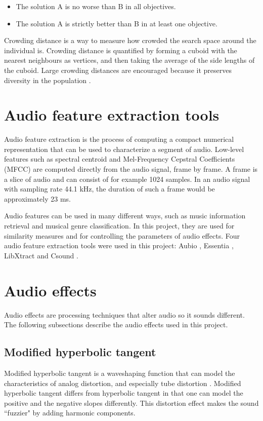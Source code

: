 \begin{itemize}  
\item The solution A is no worse than B in all objectives.
\item The solution A is strictly better than B in at least one objective.
\end{itemize}

Crowding distance is a way to measure how crowded the search space around the individual is. Crowding distance is quantified by forming a cuboid with the nearest neighbours as vertices, and then taking the average of the side lengths of the cuboid. Large crowding distances are encouraged because it preserves diversity in the population \citep{nsga2}.

\section{Audio feature extraction tools}
Audio feature extraction is the process of computing a compact numerical representation that can be used to characterize a segment of audio. Low-level features such as spectral centroid and Mel-Frequency Cepstral Coefficients (MFCC) \citep{mermelstein1976, logan2000} are computed directly from the audio signal, frame by frame. A frame is a slice of audio and can consist of for example 1024 samples. In an audio signal with sampling rate 44.1 kHz, the duration of such a frame would be approximately 23 ms.

Audio features can be used in many different ways, such as music information retrieval and musical genre classification. In this project, they are used for similarity measures and for controlling the parameters of audio effects. Four audio feature extraction tools were used in this project: Aubio \citep{brossier2003aubio}, Essentia \citep{bogdanov2013essentia}, LibXtract \citep{bullock2007libxtract} and Csound \citep{csound}.

\section{Audio effects}
Audio effects are processing techniques that alter audio so it sounds different. The following subsections describe the audio effects used in this project.

\subsection{Modified hyperbolic tangent}
Modified hyperbolic tangent is a waveshaping function that can model the characteristics of analog distortion, and especially tube distortion \citep{mtanh}. Modified hyperbolic tangent differs from hyperbolic tangent in that one can model the positive and the negative slopes differently. This distortion effect makes the sound ``fuzzier" by adding harmonic components.

